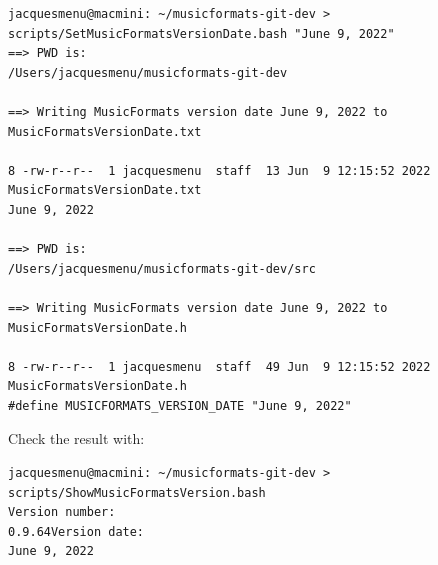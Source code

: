 \begin{enumerate}
\begin{lstlisting}[language=Terminal]
jacquesmenu@macmini: ~/musicformats-git-dev > scripts/SetMusicFormatsVersionDate.bash "June 9, 2022"
==> PWD is:
/Users/jacquesmenu/musicformats-git-dev

==> Writing MusicFormats version date June 9, 2022 to MusicFormatsVersionDate.txt

8 -rw-r--r--  1 jacquesmenu  staff  13 Jun  9 12:15:52 2022 MusicFormatsVersionDate.txt
June 9, 2022

==> PWD is:
/Users/jacquesmenu/musicformats-git-dev/src

==> Writing MusicFormats version date June 9, 2022 to MusicFormatsVersionDate.h

8 -rw-r--r--  1 jacquesmenu  staff  49 Jun  9 12:15:52 2022 MusicFormatsVersionDate.h
#define MUSICFORMATS_VERSION_DATE "June 9, 2022"
\end{lstlisting}

Check the result with:
\begin{lstlisting}[language=Terminal]
jacquesmenu@macmini: ~/musicformats-git-dev > scripts/ShowMusicFormatsVersion.bash
Version number:
0.9.64Version date:
June 9, 2022
\end{lstlisting}

\end{enumerate}
